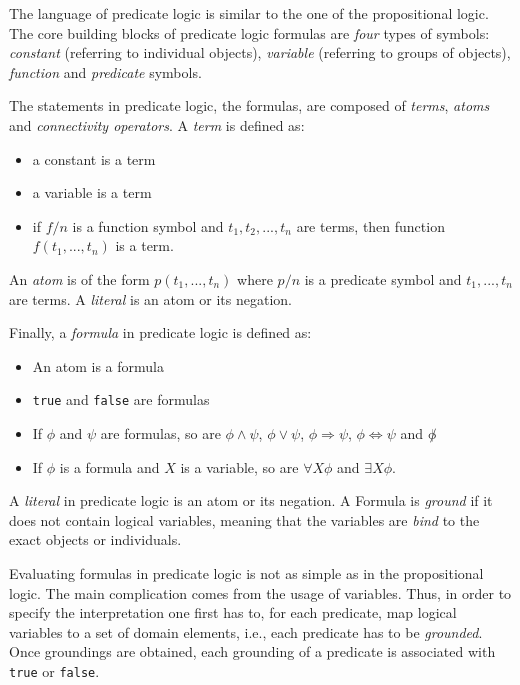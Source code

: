 The language of predicate logic is similar to the one of the propositional logic.
The core building blocks of predicate logic formulas are \textit{four} types of symbols: \textit{constant} (referring to individual objects), \textit{variable} (referring to groups of objects), \textit{function} and \textit{predicate} symbols.


The statements in predicate logic, the formulas, are composed of \textit{terms}, \textit{atoms} and \textit{connectivity operators}.
A \textit{term} is defined as:
\begin{itemize}
	\item a constant is a term
	\item a variable is a term
	\item if $f / n$ is a function symbol and $t_1,t_2,...,t_n$ are terms, then function $f(t_1,...,t_n)$ is a term.
\end{itemize}


An \textit{atom} is of the form $p(t_1,...,t_n)$ where $p/n$ is a predicate symbol and $t_1,...,t_n$ are terms.
A \textit{literal} is an atom or its negation.


Finally, a \textit{formula} in predicate logic is defined as:
\begin{itemize}
	\item An atom is a formula
	\item \texttt{true} and \texttt{false} are formulas
	\item If $\phi$ and $\psi$ are formulas, so are $\phi \wedge \psi$, $\phi \vee \psi$, $\phi \Rightarrow \psi$, $\phi \Leftrightarrow \psi$ and $\not \phi$
	\item If $\phi$ is a formula and $X$ is a variable, so are $\forall X \phi$ and $\exists X \phi$.
\end{itemize}


A \textit{literal} in predicate logic is an atom or its negation.
A Formula is \textit{ground} if it does not contain logical variables, meaning that the variables are \textit{bind} to the exact objects or individuals.







Evaluating formulas in predicate logic is not as simple as in the propositional logic.
The main complication comes from the usage of variables.
Thus, in order to specify the interpretation one first has to, for each predicate,  map logical variables to a set of domain elements, i.e., each predicate has to be \textit{grounded}.
Once groundings are obtained, each grounding of a predicate is associated with \texttt{true} or \texttt{false}.



